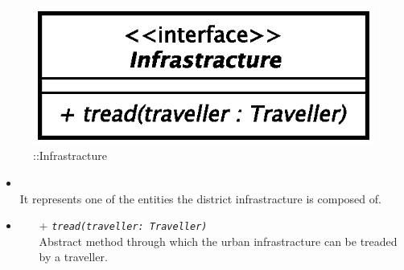 \begin{figure}[h]
\centering
\includegraphics[scale=0.6,keepaspectratio]{images/solution/app/backend/infrastracture.eps}
\caption{\pReactiveComponent::Infrastracture}
\label{fig:sd-app-infrastracture}
\end{figure}
\FloatBarrier
\begin{itemize}
  \item \textbf{\descr} \\
    It represents one of the entities the district infrastracture is composed
    of.
  \item \textbf{\ops}
  \begin{itemize} 
    \item[+] \texttt{\textit{tread(traveller: Traveller)}} \\
    Abstract method through which the urban infrastracture can be treaded by a
    traveller.
  \end{itemize}
\end{itemize}
